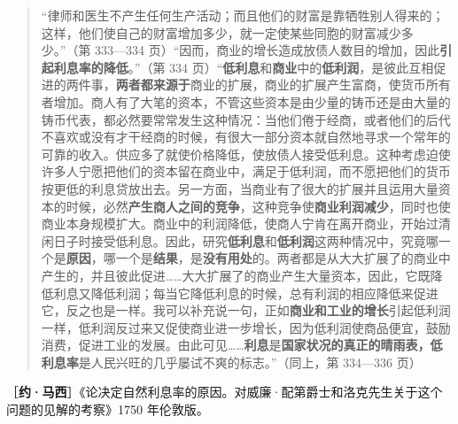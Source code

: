 \begin{quote}“律师和医生不产生任何生产活动；而且他们的财富是靠牺牲别人得来的；这样，他们使自己的财富增加多少，就一定使某些同胞的财富减少多少。”（第 333—334 页）\fontbox{\}~}“因而，商业的增长造成放债人数目的增加，因此\textbf{引起利息率的降低}。”（第 334 页）“\textbf{低利息}和\textbf{商业}中的\textbf{低利润}，是彼此互相促进的两件事，\textbf{两者都来源于}商业的扩展，商业的扩展产生富商，使货币所有者增加。商人有了大笔的资本，不管这些资本是由少量的铸币还是由大量的铸币代表，都必然要常常发生这种情况：当他们倦于经商，或者他们的后代不喜欢或没有才干经商的时候，有很大一部分资本就自然地寻求一个常年的可靠的收入。供应多了就使价格降低，使放债人接受低利息。这种考虑迫使许多人宁愿把他们的资本留在商业中，满足于低利润，而不愿把他们的货币按更低的利息贷放出去。另一方面，当商业有了很大的扩展并且运用大量资本的时候，必然\textbf{产生商人之间的竞争}，这种竞争使\textbf{商业利润减少}，同时也使商业本身规模扩大。商业中的利润降低，使商人宁肯在离开商业，开始过清闲日子时接受低利息。因此，研究\textbf{低利息}和\textbf{低利润}这两种情况中，究竟哪一个是\textbf{原因}，哪一个是\textbf{结果}，是\textbf{没有用处}的。两者都是从大大扩展了的商业中产生的，并且彼此促进……大大扩展了的商业产生大量资本，因此，它既降低利息又降低利润；每当它降低利息的时候，总有利润的相应降低来促进它，反之也是一样。我可以补充说一句，正如\textbf{商业和工业的增长}引起低利润一样，低利润反过来又促使商业进一步增长，因为低利润使商品便宜，鼓励消费，促进工业的发展。由此可见……\textbf{利息}是\textbf{国家状况的真正的晴雨表，低利息率}是人民兴旺的几乎屡试不爽的标志。”（同上，第 334—336 页）\end{quote}


［\textbf{约·马西}］《论决定自然利息率的原因。对威廉·配第爵士和洛克先生关于这个问题的见解的考察》1750 年伦敦版。

